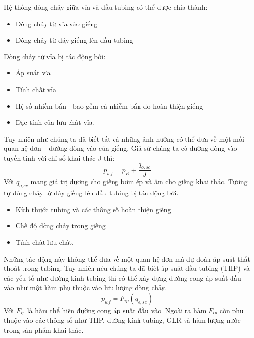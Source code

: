 \documentclass[12pt,a4paper]{report}
\begin{document}
Hệ thống dòng chảy giữa vỉa và đầu tubing có thể được chia thành:
	\begin{itemize}
		\item Dòng chảy từ vỉa vào giếng
		\item Dòng chảy từ đáy giếng lên đầu tubing
	\end{itemize}
Dòng chảy từ vỉa bị tác động bởi:
	\begin{itemize}
		\item Áp suất vỉa
		\item Tính chất vỉa
		\item Hệ số nhiễm bẩn - bao gồm cả nhiễm bẩn do hoàn thiện giếng
		\item Đặc tính của lưu chất vỉa.
	\end{itemize}
Tuy nhiên như chúng ta đã biết tất cả những ảnh hưởng có thể đưa về một mối quan hệ đơn – đường dòng vào của giếng. Giả sử chúng ta có đường dòng vào tuyến tính với chỉ số khai thác J thì:
	\begin{equation}
		p_{wf} = p_R + \dfrac{q_{o,sc}}{J}
	\end{equation}
Với $q_{o,sc}$ mang giá trị dương cho giếng bơm ép và âm cho giếng khai thác. Tương tự dòng chảy từ đáy giếng lên đầu tubing bị tác động bởi:
	\begin{itemize}
		\item Kích thước tubing và các thông số hoàn thiện giếng
		\item Chế độ dòng chảy trong giếng
		\item Tính chất lưu chất.
	\end{itemize}
Những tác động này không thể đưa về một quan hệ đơn mà dự đoán áp suất thất thoát trong tubing. Tuy nhiên nếu chúng ta đã biết áp suất đầu tubing (THP)  và các yếu tố như đường kính tubing thì có thể xây dựng đường cong áp suất đầu vào như một hàm phụ thuộc vào lưu lượng dòng chảy.
	\begin{equation}
		p_{wf} = F_{ip}(q_{o,sc})
	\end{equation}
Với $F_{ip}$ là hàm thể hiện đường cong áp suất đầu vào. Ngoài ra hàm $F_{ip}$ còn phụ thuộc vào các thông số như THP, đường kính tubing, GLR  và hàm lượng nước trong sản phẩm khai thác.
\end{document}
